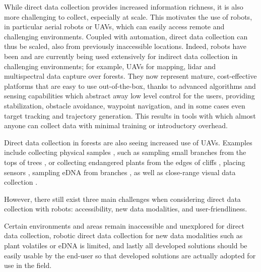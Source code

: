 While direct data collection provides increased information richness, it is also more challenging to collect, especially at scale. 
This motivates the use of robots, in particular aerial robots or UAVs, which can easily access remote and challenging environments. Coupled with automation, direct data collection can thus be scaled, also from previously inaccessible locations.
Indeed, robots have been and are currently being used extensively for indirect data collection in challenging environments; for example, UAVs for mapping, lidar and multispectral data capture over forests. They now represent mature, cost-effective platforms that are easy to use out-of-the-box, thanks to advanced algorithms and sensing capabilities which abstract away low level control for the users, providing stabilization, obstacle avoidance, waypoint navigation, and in some cases even target tracking and trajectory generation. This results in tools with which almost anyone can collect data with minimal training or introductory overhead. 






Direct data collection in forests are also seeing increased use of UAVs.
Examples include collecting physical samples \cite{Krasylenko2023}, such as sampling small branches from the tops of trees \cite{Charron2020}, or collecting endangered plants from the edges of cliffs \cite{LaVigne2022}, placing sensors \cite{Hamaza2020, Farinha2020}, sampling eDNA from branches \cite{Aucone2023a}, as well as close-range visual data collection \cite{Liu2022, Zhou2022}.

However, there still exist three main challenges when considering direct data collection with robots: accessibility, new data modalities, and user-friendliness.

Certain environments and areas remain inaccessible and unexplored for direct data collection, robotic direct data collection for new data modalities such as plant volatiles or eDNA is limited, and lastly all developed solutions should be easily usable by the end-user so that developed solutions are actually adopted for use in the field.

